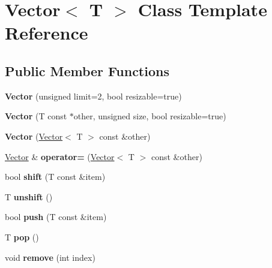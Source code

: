 \hypertarget{classVector}{}\section{Vector$<$ T $>$ Class Template Reference}
\label{classVector}
\subsection*{Public Member Functions}
\begin{DoxyCompactItemize}
\item 
\mbox{\label{classVector_a2d2738e562188d3c4e08c3fc7075dc0a}} 
{\bfseries Vector} (unsigned limit=2, bool resizable=true)
\item 
\mbox{\label{classVector_a363b28b2093e32cb4ee93148c065782b}} 
{\bfseries Vector} (T const $\ast$other, unsigned size, bool resizable=true)
\item 
\mbox{\label{classVector_a857e13a3af4fb6e3eea77935cfcd4ef2}} 
{\bfseries Vector} (\hyperlink{classVector}{Vector}$<$ T $>$ const \&other)
\item 
\mbox{\label{classVector_a0feef299594680034402e23ff28b9f45}} 
\hyperlink{classVector}{Vector} \& {\bfseries operator=} (\hyperlink{classVector}{Vector}$<$ T $>$ const \&other)
\item 
\mbox{\label{classVector_adb54584983bf6750f60d5ad375f6c603}} 
bool {\bfseries shift} (T const \&item)
\item 
\mbox{\label{classVector_a4fda2f9168cac24815062130bada9a8d}} 
T {\bfseries unshift} ()
\item 
\mbox{\label{classVector_ad15116a272b1924dc11e3543a8fc95d8}} 
bool {\bfseries push} (T const \&item)
\item 
\mbox{\label{classVector_aef4a3e10a9844ea17cdd89cee17e495a}} 
T {\bfseries pop} ()
\item 
\mbox{\label{classVector_abc1ce95078c61fd5826583b0de7279b4}} 
void {\bfseries remove} (int index)
\item 

\end{DoxyCompactItemize}
